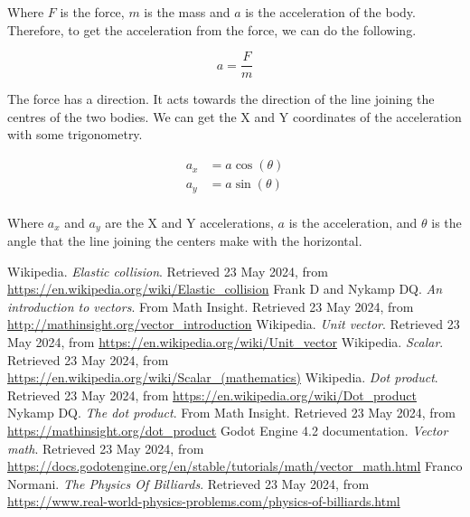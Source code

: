 \documentclass{amsart}
\begin{document}
Where $F$ is the force, $m$ is the mass and $a$ is the acceleration of the
body. Therefore, to get the acceleration from the force, we can do the
following.

\begin{displaymath}
  a = \frac{F}{m}
\end{displaymath}

The force has a direction. It acts towards the direction of the line joining
the centres of the two bodies. We can get the X and Y coordinates of the
acceleration with some trigonometry.

\begin{align*}
  a_x &= a \cos(\theta) \\
  a_y &= a \sin(\theta) \\
\end{align*}

Where $a_x$ and $a_y$ are the X and Y accelerations, $a$ is the acceleration,
and $\theta$ is the angle that the line joining the centers make with the
horizontal.

\newpage

\begin{thebibliography}{9}
  Wikipedia. \textit{Elastic collision}. Retrieved 23 May 2024, from
  \url{https://en.wikipedia.org/wiki/Elastic_collision}
  Frank D and Nykamp DQ. \textit{An introduction to vectors}. From Math Insight. Retrieved 23 May 2024, from
  \url{http://mathinsight.org/vector_introduction}
  Wikipedia. \textit{Unit vector}. Retrieved 23 May 2024, from
  \url{https://en.wikipedia.org/wiki/Unit_vector}
  Wikipedia. \textit{Scalar}. Retrieved 23 May 2024, from
  \url{https://en.wikipedia.org/wiki/Scalar_(mathematics)}
  Wikipedia. \textit{Dot product}. Retrieved 23 May 2024, from
  \url{https://en.wikipedia.org/wiki/Dot_product}
  Nykamp DQ. \textit{The dot product}. From Math Insight. Retrieved 23 May 2024, from
  \url{https://mathinsight.org/dot_product}
  Godot Engine 4.2 documentation. \textit{Vector math}. Retrieved 23 May 2024, from
  \url{https://docs.godotengine.org/en/stable/tutorials/math/vector_math.html}
  Franco Normani. \textit{The Physics Of Billiards}. Retrieved 23 May 2024, from
  \url{https://www.real-world-physics-problems.com/physics-of-billiards.html}
\end{thebibliography}
\end{document}
